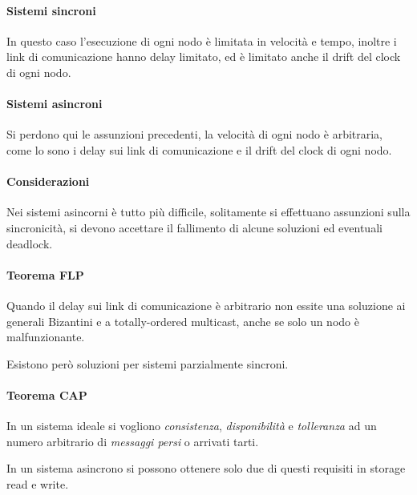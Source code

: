 \paragraph{Sistemi sincroni}
In questo caso l'esecuzione di ogni nodo è limitata in velocità 
e tempo, inoltre i link di comunicazione hanno delay limitato, 
ed è limitato anche il drift del clock di ogni nodo.

\paragraph{Sistemi asincroni}
Si perdono qui le assunzioni precedenti, 
la velocità di ogni nodo è arbitraria, come lo sono 
i delay sui link di comunicazione e il drift del clock di ogni nodo.

\paragraph{Considerazioni}
Nei sistemi asincorni è tutto più difficile, solitamente si 
effettuano assunzioni sulla sincronicità, si devono accettare 
il fallimento di alcune soluzioni ed eventuali deadlock.

\paragraph{Teorema FLP}
Quando il delay sui link di comunicazione è arbitrario 
non essite una soluzione ai generali Bizantini e a totally-ordered
multicast, anche se solo un nodo è malfunzionante.

Esistono però soluzioni per sistemi parzialmente sincroni.

\paragraph{Teorema CAP}
In un sistema ideale si vogliono \emph{consistenza}, \emph{disponibilità} 
e \emph{tolleranza} ad un numero arbitrario di \emph{messaggi persi} o 
arrivati tarti.

In un sistema asincrono si possono ottenere solo due 
di questi requisiti in storage read e write.